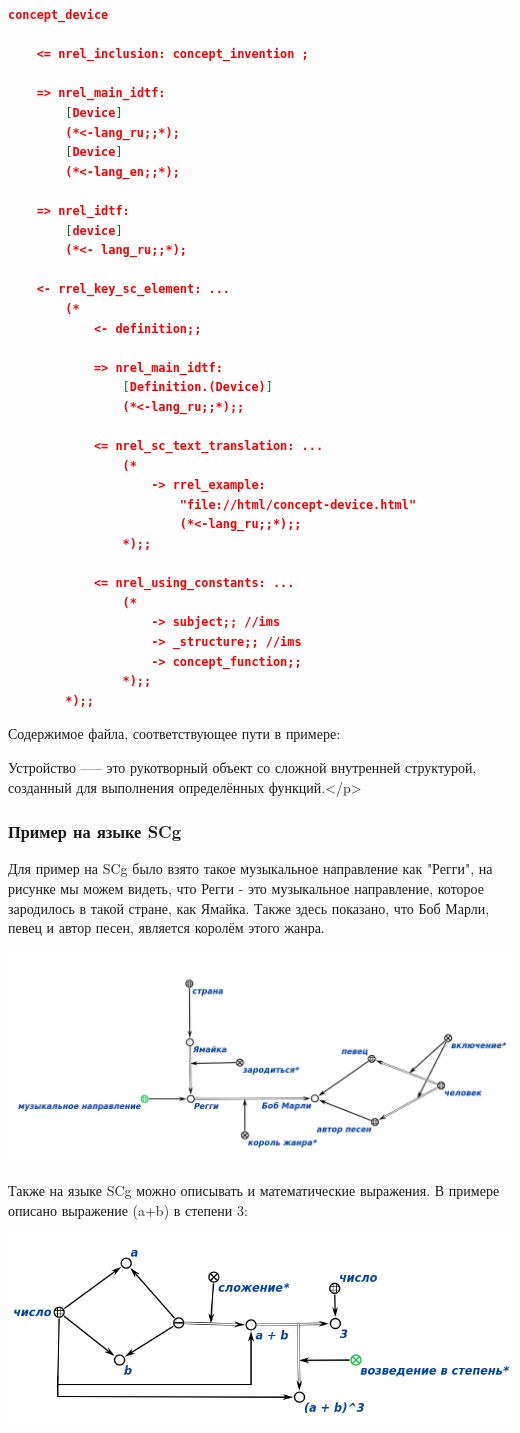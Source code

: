  \begin{lstlisting}[language=json,firstnumber=1]
concept_device

    <= nrel_inclusion: concept_invention ;

    => nrel_main_idtf:
        [Device]
        (*<-lang_ru;;*);
        [Device]
        (*<-lang_en;;*);

    => nrel_idtf:
        [device]
        (*<- lang_ru;;*);

    <- rrel_key_sc_element: ...
        (*
            <- definition;;

            => nrel_main_idtf:
                [Definition.(Device)]
                (*<-lang_ru;;*);;

            <= nrel_sc_text_translation: ...
                (* 
                    -> rrel_example: 
                        "file://html/concept-device.html"
                        (*<-lang_ru;;*);; 
                *);;

            <= nrel_using_constants: ...
                (*
                    -> subject;; //ims
                    -> _structure;; //ims
                    -> concept_function;;
                *);;
        *);;
\end{lstlisting}
Содержимое файла, соответствующее пути в примере:

Устройство --— это рукотворный объект со сложной внутренней структурой, 
созданный для выполнения определённых функций.</p>

\newpage

\subsubsection{Пример на языке SCg}

Для пример на SCg было взято такое музыкальное направление как "Регги", на рисунке мы можем видеть, что Регги - это музыкальное направление, которое зародилось в такой стране, как Ямайка. Также здесь показано, что Боб Марли, певец и автор песен, является королём этого жанра.

\includegraphics[scale=0.4]{images/sc10.png}

 Также на языке SCg можно описывать и математические выражения.
 В примере описано выражение (a+b) в степени 3:
 
\includegraphics[scale=0.5]{images/sc11.png}



